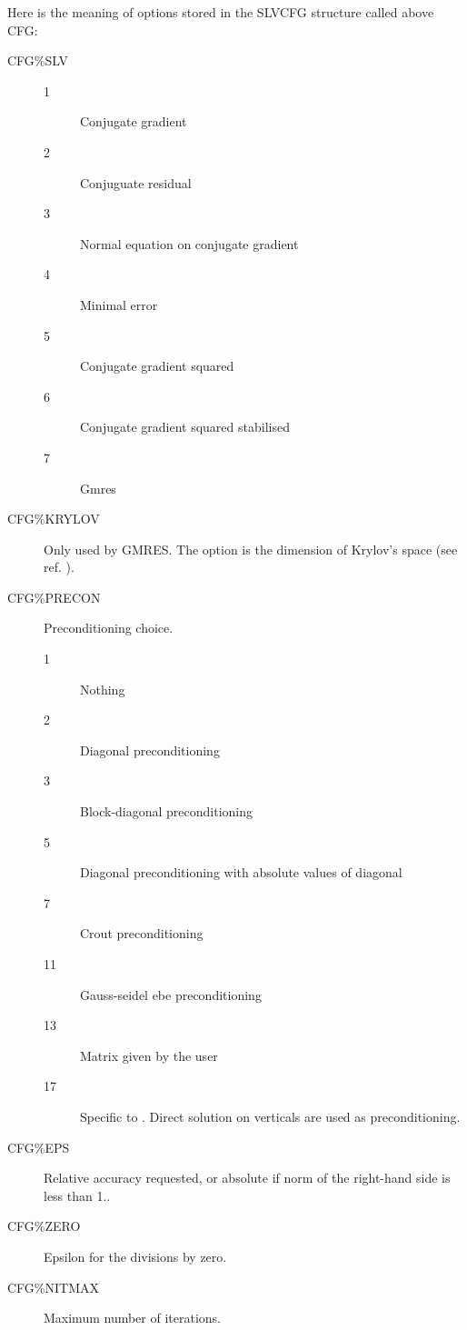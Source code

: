 Here is the meaning of options stored in the SLVCFG structure called above CFG:
\begin{description}
  \item [CFG\%SLV]
    \begin{description}
      \item [1] Conjugate gradient
      \item [2] Conjuguate residual
      \item [3] Normal equation on conjugate gradient
      \item [4] Minimal error
      \item [5] Conjugate gradient squared
      \item [6] Conjugate gradient squared stabilised
      \item [7] Gmres
    \end{description}

  \item [CFG\%KRYLOV] Only used by GMRES. The option is the dimension of
      Krylov's space (see ref. \citet{Hervouet1991}).

  \item [CFG\%PRECON] Preconditioning choice.
    \begin{description}
      \item [1] Nothing
      \item [2] Diagonal preconditioning
      \item [3] Block-diagonal preconditioning
      \item [5] Diagonal preconditioning with absolute values of diagonal
      \item [7] Crout preconditioning
      \item [11] Gauss-seidel ebe preconditioning
      \item [13] Matrix given by the user
      \item [17] Specific to . Direct solution on verticals are
        used as preconditioning.
    \end{description}

  \item [CFG\%EPS] Relative accuracy requested, or absolute if norm of the
      right-hand side is less than 1..

  \item [CFG\%ZERO] Epsilon for the divisions by zero.

  \item [CFG\%NITMAX] Maximum number of iterations.
\end{description}

